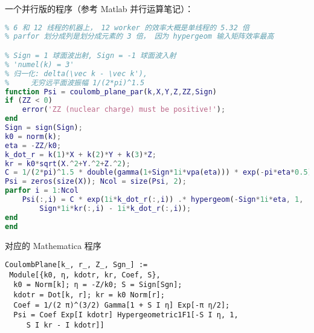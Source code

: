 一个并行版的程序（参考 Matlab 并行运算笔记）：
\begin{lstlisting}[language=matlab, caption=coulomb\_plane\_par.m]
% 直角坐标系的库仑平面波 （coulomb_plane 的并行版， 需要 parallel toolbox）
% 6 和 12 线程的机器上， 12 worker 的效率大概是单线程的 5.32 倍
% parfor 划分成列是划分成元素的 3 倍， 因为 hypergeom 输入矩阵效率最高

% Sign = 1 球面波出射, Sign = -1 球面波入射
% 'numel(k) = 3'
% 归一化: delta(\vec k - \vec k'),
%     无穷远平面波振幅 1/(2*pi)^1.5
function Psi = coulomb_plane_par(k,X,Y,Z,ZZ,Sign)
if (ZZ < 0)
    error('ZZ (nuclear charge) must be positive!');
end
Sign = sign(Sign);
k0 = norm(k);
eta = -ZZ/k0;
k_dot_r = k(1)*X + k(2)*Y + k(3)*Z;
kr = k0*sqrt(X.^2+Y.^2+Z.^2);
C = 1/(2*pi)^1.5 * double(gamma(1+Sign*1i*vpa(eta))) * exp(-pi*eta*0.5);
Psi = zeros(size(X)); Ncol = size(Psi, 2);
parfor i = 1:Ncol
    Psi(:,i) = C * exp(1i*k_dot_r(:,i)) .* hypergeom(-Sign*1i*eta, 1, ....
        Sign*1i*kr(:,i) - 1i*k_dot_r(:,i));
end
end
\end{lstlisting}

对应的 Mathematica 程序 %
\begin{lstlisting}[language=mma]
CoulombPlane[k_, r_, Z_, Sgn_] := 
 Module[{k0, η, kdotr, kr, Coef, S},
  k0 = Norm[k]; η = -Z/k0; S = Sign[Sgn];
  kdotr = Dot[k, r]; kr = k0 Norm[r];
  Coef = 1/(2 π)^(3/2) Gamma[1 + S I η] Exp[-π η/2];
  Psi = Coef Exp[I kdotr] Hypergeometric1F1[-S I η, 1, 
     S I kr - I kdotr]]
\end{lstlisting}
